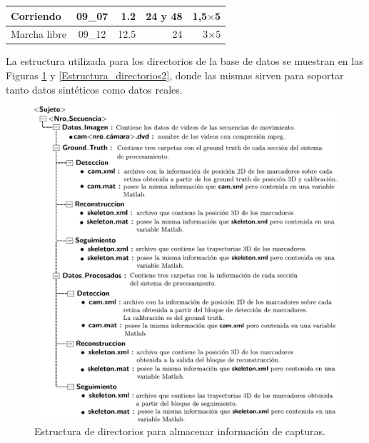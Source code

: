 \begin{table}[H]
\begin{tabular}{|l|c|r|r|r|}
Corriendo                                                                        & 09\_07                     & 1.2                                                                                    & 24 y 48                      &1,5$\times $5                                                                              \\ \hline
Marcha libre                                                                     & 09\_12                     & 12.5                                                                                   & 24                           &3$\times $5                                                                              \\ \hline
\end{tabular}
\end{table}


La estructura utilizada para los directorios de la base de datos se muestran en las Figuras \ref{Estructura_directorios} y \ref{Estructura_directorios2}, donde las mismas sirven para soportar tanto datos sintéticos como datos reales. 

\begin{figure}[ht!]
\includegraphics[scale=0.695]{img/Base_Datos/Estructura_directorios.pdf}
\caption{Estructura de directorios para almacenar información de capturas.}
\label{Estructura_directorios}
\end{figure}


